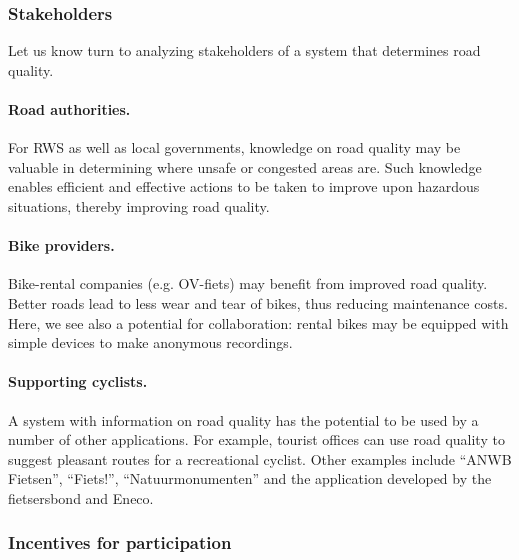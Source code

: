 \documentclass[a4paper,11pt]{article}
\begin{document}
\subsubsection{Stakeholders}

Let us know turn to analyzing stakeholders of a system that determines road quality.

\paragraph{Road authorities.}
For RWS as well as local governments, knowledge on road quality may be valuable in determining where unsafe or congested areas are. Such knowledge enables efficient and effective actions to be taken to improve upon hazardous situations, thereby improving road quality.

\paragraph{Bike providers.}
Bike-rental companies (e.g. OV-fiets) may benefit from improved road quality. Better roads lead to less wear and tear of bikes, thus reducing maintenance costs. Here, we see also a potential for collaboration: rental bikes may be equipped with simple devices to make anonymous recordings.

\paragraph{Supporting cyclists.}
A system with information on road quality has the potential to be used by a number of other applications. For example, tourist offices can use road quality to suggest pleasant routes for a recreational cyclist. Other examples include ``ANWB Fietsen'', ``Fiets!'', ``Natuurmonumenten'' and the application developed by the fietsersbond and Eneco.

\subsubsection{Incentives for participation}
\end{document}
